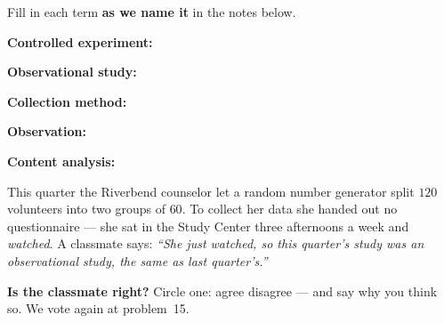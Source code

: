 \documentclass[12pt]{article}
\newcommand{\termrowheight}{1.7cm}
\newlength{\termrowinset}\setlength{\termrowinset}{7pt}
\newcommand{\vterm}[1]{%
  \par\noindent\begin{minipage}[t][\termrowheight][t]{\linewidth}%
    \vspace*{\termrowinset}%
    \textbf{\textcolor{cerulean}{#1:}}%
  \end{minipage}\par}
\begin{document}

\vspace{0.15in}

\begin{vocabbox}
\small
Fill in each term \textbf{as we name it} in the notes below.
\vterm{Controlled experiment}
\vterm{Observational study}
\vterm{Collection method}
\vterm{Observation}
\vterm{Content analysis}
\end{vocabbox}

\boxguard[12]
\begin{hookbox}
\small
This quarter the Riverbend counselor let a random number generator split $120$ volunteers into
two groups of $60$. To collect her data she handed out no questionnaire --- she sat in the Study
Center three afternoons a week and \emph{watched}. A classmate says: \emph{``She just watched, so
this quarter's study was an observational study, the same as last quarter's.''}

\vspace{3pt}
\textbf{Is the classmate right?} Circle one: \quad agree \qquad disagree
\quad --- and say why you think so. We vote again at problem~15.
\par{}
\end{hookbox}
\end{document}
